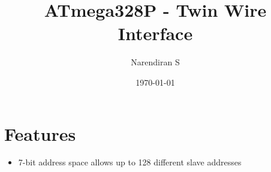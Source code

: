 \documentclass{article}
\title{ATmega328P - Twin Wire Interface}
\author{Narendiran S}
\date{\today}
\begin{document}
\maketitle

\section{Features}
\begin{itemize}
    \item 7-bit address space allows up to 128 different slave addresses
\end{itemize}
\end{document}
